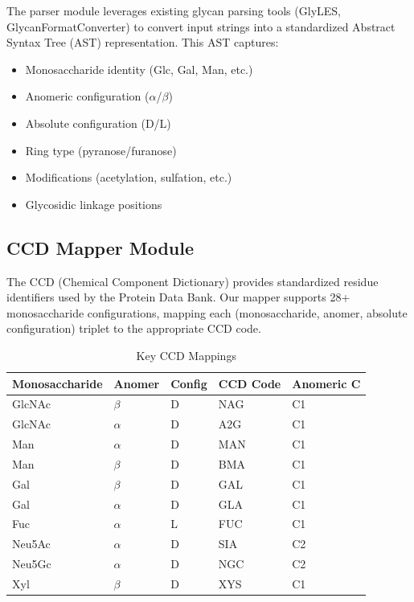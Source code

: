 The parser module leverages existing glycan parsing tools (GlyLES, GlycanFormatConverter) to convert input strings into a standardized Abstract Syntax Tree (AST) representation. This AST captures:
\begin{itemize}
\item Monosaccharide identity (Glc, Gal, Man, etc.)
\item Anomeric configuration ($\alpha$/$\beta$)
\item Absolute configuration (D/L)
\item Ring type (pyranose/furanose)
\item Modifications (acetylation, sulfation, etc.)
\item Glycosidic linkage positions
\end{itemize}

\subsection{CCD Mapper Module}

The CCD (Chemical Component Dictionary) provides standardized residue identifiers used by the Protein Data Bank. Our mapper supports 28+ monosaccharide configurations, mapping each (monosaccharide, anomer, absolute configuration) triplet to the appropriate CCD code.

\begin{table}[htbp]
\caption{Key CCD Mappings}
\label{tab:ccd}
\centering
\begin{tabular}{lllll}
\toprule
\textbf{Monosaccharide} & \textbf{Anomer} & \textbf{Config} & \textbf{CCD Code} & \textbf{Anomeric C} \\
\midrule
GlcNAc & $\beta$ & D & NAG & C1 \\
GlcNAc & $\alpha$ & D & A2G & C1 \\
Man & $\alpha$ & D & MAN & C1 \\
Man & $\beta$ & D & BMA & C1 \\
Gal & $\beta$ & D & GAL & C1 \\
Gal & $\alpha$ & D & GLA & C1 \\
Fuc & $\alpha$ & L & FUC & C1 \\
Neu5Ac & $\alpha$ & D & SIA & C2 \\
Neu5Gc & $\alpha$ & D & NGC & C2 \\
Xyl & $\beta$ & D & XYS & C1 \\
\bottomrule
\end{tabular}
\end{table}

